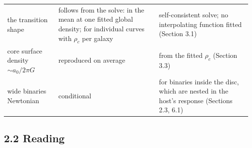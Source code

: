 \documentclass[
  10pt,
]{article}
\begin{document}
\begin{longtable}[]{@{}lll@{}}
\begin{minipage}[t]{0.24\columnwidth}
the transition shape\strut
\end{minipage} & \begin{minipage}[t]{0.20\columnwidth}\raggedright
follows from the solve: in the mean at one fitted global density; for individual curves with $\rho_c$ per galaxy\strut
\end{minipage} & \begin{minipage}[t]{0.50\columnwidth}\raggedright
self-consistent solve; no interpolating function fitted (Section 3.1)\strut
\end{minipage}\tabularnewline
\begin{minipage}[t]{0.24\columnwidth}\raggedright
core surface density $\sim a_0/2\pi G$\strut
\end{minipage} & \begin{minipage}[t]{0.20\columnwidth}\raggedright
reproduced on average\strut
\end{minipage} & \begin{minipage}[t]{0.50\columnwidth}\raggedright
from the fitted $\rho_c$ (Section 3.3)\strut
\end{minipage}\tabularnewline
\begin{minipage}[t]{0.24\columnwidth}\raggedright
wide binaries Newtonian\strut
\end{minipage} & \begin{minipage}[t]{0.20\columnwidth}\raggedright
conditional\strut
\end{minipage} & \begin{minipage}[t]{0.50\columnwidth}\raggedright
for binaries inside the disc, which are nested in the host's response (Sections 2.3, 6.1)\strut
\end{minipage}\tabularnewline
\bottomrule
\end{longtable}

\subsection{2.2 Reading}\label{reading}
\end{document}

